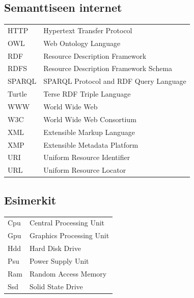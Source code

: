 \documentclass[finnish, 12pt, a4paper, elec, utf8, pdfa, online]{aaltothesis}
\begin{document}
\thesistableofcontents



\subsection*{Semanttiseen internet}
\begin{tabular}{ll}
HTTP         & Hypertext Transfer Protocol \\
OWL          & Web Ontology Language \\
RDF          & Resource Description Framework \\
RDFS         & Resource Description Framework Schema\\
SPARQL       & SPARQL Protocol and RDF Query Language \\
Turtle       & Terse RDF Triple Language \\
WWW          & World Wide Web \\
W3C          & World Wide Web Consortium \\
XML          & Extensible Markup Language \\
XMP          & Extensible Metadata Platform \\

URI          & Uniform Resource Identifier \\
URL          & Uniform Resource Locator \\
\end{tabular}

\subsection*{Esimerkit}
\begin{tabular}{ll}
Cpu          & Central Processing Unit \\
Gpu          & Graphics Processing Unit \\
Hdd          & Hard Disk Drive \\
Psu          & Power Supply Unit \\
Ram          & Random Access Memory \\
Ssd          & Solid State Drive \\
\end{tabular}

\cleardoublepage

\end{document}
